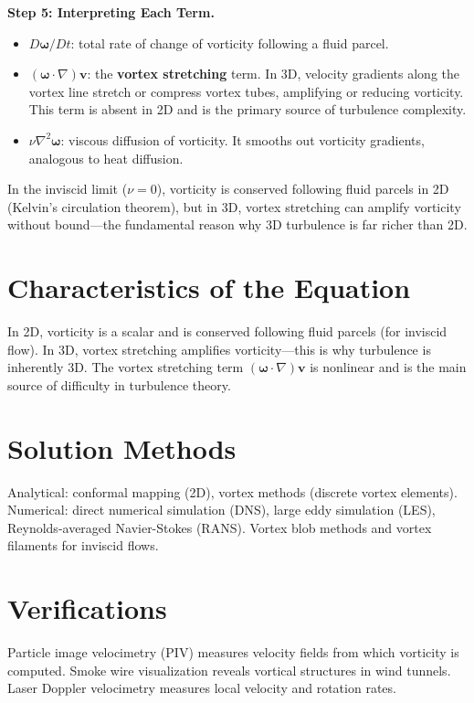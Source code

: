 \textbf{Step 5: Interpreting Each Term.}

\begin{itemize}
\item $D\boldsymbol{\omega}/Dt$: total rate of change of vorticity following a fluid parcel.
\item $(\boldsymbol{\omega}\cdot\nabla)\mathbf{v}$: the \textbf{vortex stretching} term. In 3D, velocity gradients along the vortex line stretch or compress vortex tubes, amplifying or reducing vorticity. This term is absent in 2D and is the primary source of turbulence complexity.
\item $\nu\nabla^2\boldsymbol{\omega}$: viscous diffusion of vorticity. It smooths out vorticity gradients, analogous to heat diffusion.
\end{itemize}

In the inviscid limit ($\nu = 0$), vorticity is conserved following fluid parcels in 2D (Kelvin's circulation theorem), but in 3D, vortex stretching can amplify vorticity without bound---the fundamental reason why 3D turbulence is far richer than 2D.

\section*{Characteristics of the Equation}

In 2D, vorticity is a scalar and is conserved following fluid parcels (for inviscid flow). In 3D, vortex stretching amplifies vorticity---this is why turbulence is inherently 3D. The vortex stretching term $(\boldsymbol{\omega} \cdot \nabla)\mathbf{v}$ is nonlinear and is the main source of difficulty in turbulence theory.
\section*{Solution Methods}

Analytical: conformal mapping (2D), vortex methods (discrete vortex elements). Numerical: direct numerical simulation (DNS), large eddy simulation (LES), Reynolds-averaged Navier-Stokes (RANS). Vortex blob methods and vortex filaments for inviscid flows.
\section*{Verifications}

Particle image velocimetry (PIV) measures velocity fields from which vorticity is computed. Smoke wire visualization reveals vortical structures in wind tunnels. Laser Doppler velocimetry measures local velocity and rotation rates.
